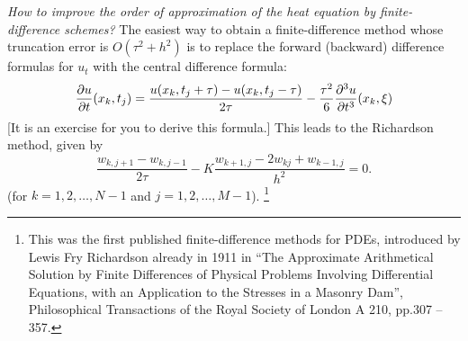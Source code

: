\emph{How to improve the order of approximation
of the heat equation by finite-difference schemes?} The easiest way
to obtain a finite-difference method whose truncation error is
$O(\tau^{2}+h^{2})$ is to replace the forward (backward)
difference formulas for $u_{t}$ with the central difference
formula:
\begin{equation}
\frac{{\partial} u}{{\partial} t}(x_k,t_j)=\frac{u(x_k,t_j+\tau)-u(x_k,t_j-\tau)}{2\tau}-
\frac{\tau^2}{6}\frac{{\partial}^3 u}{{\partial} t^3}(x_k,\xi) \label{aa15}
\end{equation}
[It is an exercise for you to derive this formula.]
This leads to the Richardson method, given by
\begin{equation}
\frac{w_{k,j+1}-w_{k,j-1}}{2\tau}-K \frac{w_{k+1,
j}-2w_{kj}+w_{k-1,j}}{h^{2}}=0. \label{d4}
\end{equation}
(for $k=1, 2, \dots, N-1$ and $j=1, 2, \dots, M-1$). 
\footnote{This was the first published finite-difference methods for PDEs, introduced by Lewis Fry Richardson already in 1911 in
``The Approximate Arithmetical Solution by Finite Differences of Physical Problems Involving Differential Equations, with an Application to the Stresses in a Masonry Dam'', Philosophical Transactions of the Royal Society of London A 210, pp.307 -- 357.}


